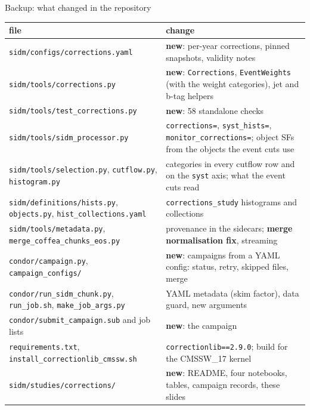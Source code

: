 \documentclass[aspectratio=169,11pt]{beamer}
\begin{document}
\begin{frame}{Backup: what changed in the repository}
  {\tiny
  \begin{tabular}{@{}p{5.8cm}p{7.5cm}@{}}
    \toprule
    file & change \\
    \midrule
    \texttt{sidm/configs/corrections.yaml} & \textbf{new}: per-year corrections, pinned snapshots, validity notes \\
    \texttt{sidm/tools/corrections.py} & \textbf{new}: \texttt{Corrections}, \texttt{EventWeights} (with the weight categories), jet and b-tag helpers \\
    \texttt{sidm/tools/test\_corrections.py} & \textbf{new}: 58 standalone checks \\
    \texttt{sidm/tools/sidm\_processor.py} & \texttt{corrections=}, \texttt{syst\_hists=}, \texttt{monitor\_corrections=}; object SFs from the objects the event cuts use \\
    \texttt{sidm/tools/selection.py}, \texttt{cutflow.py}, \texttt{histogram.py} & categories in every cutflow row and on the \texttt{syst} axis; what the event cuts read \\
    \texttt{sidm/definitions/hists.py}, \texttt{objects.py}, \texttt{hist\_collections.yaml} & \texttt{corrections\_study} histograms and collections \\
    \texttt{sidm/tools/metadata.py}, \texttt{merge\_coffea\_chunks\_eos.py} & provenance in the sidecars; \textbf{merge normalisation fix}, streaming \\
    \texttt{condor/campaign.py}, \texttt{campaign\_configs/} & \textbf{new}: campaigns from a YAML config: status, retry, skipped files, merge \\
    \texttt{condor/run\_sidm\_chunk.py}, \texttt{run\_job.sh}, \texttt{make\_job\_args.py} & YAML metadata (skim factor), data guard, new arguments \\
    \texttt{condor/submit\_campaign.sub} and job lists & \textbf{new}: the campaign \\
    \texttt{requirements.txt}, \texttt{install\_correctionlib\_cmssw.sh} & \texttt{correctionlib==2.9.0}; build for the CMSSW\_17 kernel \\
    \texttt{sidm/studies/corrections/} & \textbf{new}: README, four notebooks, tables, campaign records, these slides \\
    \bottomrule
  \end{tabular}}
\end{frame}
\end{document}
